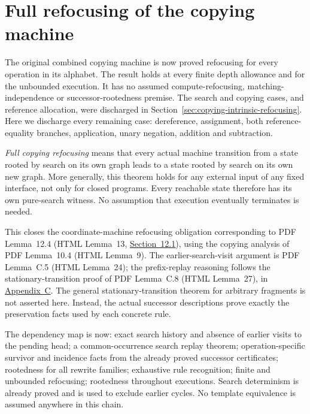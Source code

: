 \clearpage
\section{Full refocusing of the copying machine}
\label{sec:copying-full-refocusing}
The original combined copying machine is now proved refocusing for every
operation in its alphabet. The result holds at every finite depth allowance
and for the unbounded execution. It has no assumed compute-refocusing,
matching-independence or successor-rootedness premise. The search and copying
cases, and reference allocation, were discharged in
Section~\ref{sec:copying-intrinsic-refocusing}. Here we discharge every remaining
case: dereference, assignment, both reference-equality branches, application,
unary negation, addition and subtraction.

\emph{Full copying refocusing} means that every actual machine transition from
a state rooted by search on its own graph leads to a state rooted by search on
its own new graph. More generally, this theorem holds for any external input
of any fixed interface, not only for closed programs. Every reachable state
therefore has its own pure-search witness. No assumption that execution
eventually terminates is needed.

This closes the coordinate-machine refocusing obligation corresponding to
PDF Lemma~12.4 (HTML Lemma~13,
\href{https://arxiv.org/html/1907.01257v5\#S12.SS1}{Section~12.1}), using the
copying analysis of PDF Lemma~10.4 (HTML Lemma~9). The earlier-search-visit
argument is PDF Lemma~C.5 (HTML Lemma~24); the prefix-replay reasoning follows
the stationary-transition proof of PDF Lemma~C.8 (HTML Lemma~27), in
\href{https://arxiv.org/html/1907.01257v5\#A3}{Appendix~C}.
The general stationary-transition theorem for arbitrary fragments is not
asserted here. Instead, the actual successor descriptions prove exactly the
preservation facts used by each concrete rule.

The dependency map is now: exact search history and absence of earlier visits
to the pending head; a common-occurrence search replay theorem; operation-specific
survivor and incidence facts from the already proved successor certificates;
rootedness for all rewrite families; exhaustive rule recognition; finite and
unbounded refocusing; rootedness throughout executions. Search determinism is
already proved and is used to exclude earlier cycles. No template equivalence
is assumed anywhere in this chain.

